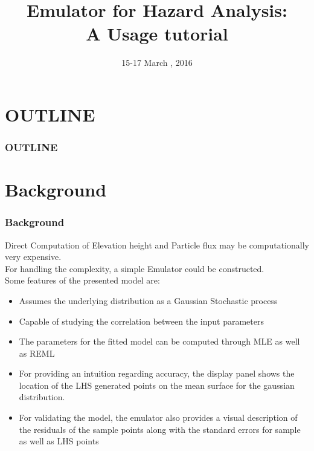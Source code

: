 \documentclass[10pt]{beamer}
\begin{document}
\title {\bfseries{\sc Emulator for Hazard Analysis:\\ A Usage tutorial}}
\author {}
\date{\small 15-17 March , 2016} 
\begin{frame}
\titlepage
\end{frame}
\section*{OUTLINE}
\begin{frame}
\frametitle{OUTLINE}  
\tableofcontents
\end{frame}

\section{Background}
\begin{frame}
\frametitle{Background}
Direct Computation of Elevation height and Particle flux may be computationally very expensive.\\
\vspace{1mm}
For handling the complexity, a simple Emulator could be constructed. \\
Some features of the presented model are:\\
\begin{itemize} 
    \item  Assumes the underlying distribution as a Gaussian Stochastic process
    \item Capable of studying the correlation between the input parameters
    \item The parameters for the fitted model can be computed through MLE as well as REML
    \item For providing an intuition regarding accuracy, the display panel shows the location of the LHS generated points on the mean surface for the gaussian distribution.
    \item For validating the model, the emulator also provides a visual description of the residuals of the sample points along with the standard errors for sample as well as LHS points

\end{itemize}
\end{frame}
\end{document}
